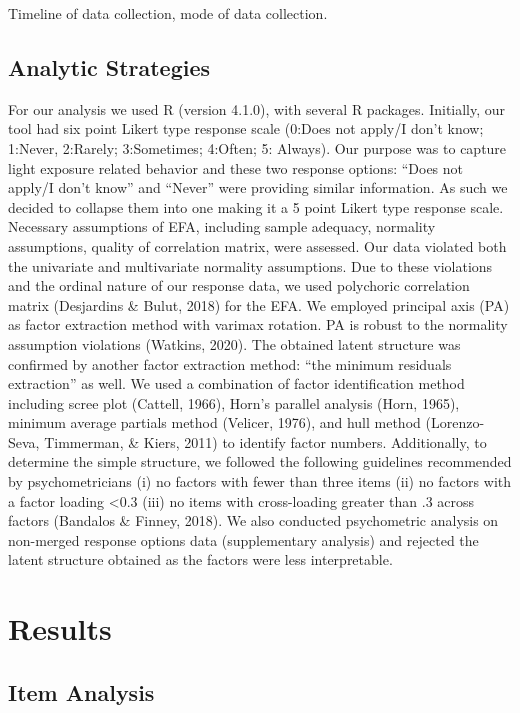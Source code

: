 \documentclass[
  english,
  man]{apa6}
\begin{document}
Timeline of data collection, mode of data collection.

\hypertarget{analytic-strategies}{%
\subsection{Analytic Strategies}\label{analytic-strategies}}

For our analysis we used R (version 4.1.0), with several R packages. Initially, our tool had six point Likert type response scale (0:Does not apply/I don't know; 1:Never, 2:Rarely; 3:Sometimes; 4:Often; 5: Always). Our purpose was to capture light exposure related behavior and these two response options: ``Does not apply/I don't know'' and ``Never'' were providing similar information. As such we decided to collapse them into one making it a 5 point Likert type response scale. Necessary assumptions of EFA, including sample adequacy, normality assumptions, quality of correlation matrix, were assessed. Our data violated both the univariate and multivariate normality assumptions. Due to these violations and the ordinal nature of our response data, we used polychoric correlation matrix (Desjardins \& Bulut, 2018) for the EFA. We employed principal axis (PA) as factor extraction method with varimax rotation. PA is robust to the normality assumption violations (Watkins, 2020). The obtained latent structure was confirmed by another factor extraction method: ``the minimum residuals extraction'' as well. We used a combination of factor identification method including scree plot (Cattell, 1966), Horn's parallel analysis (Horn, 1965), minimum average partials method (Velicer, 1976), and hull method (Lorenzo-Seva, Timmerman, \& Kiers, 2011) to identify factor numbers. Additionally, to determine the simple structure, we followed the following guidelines recommended by psychometricians (i) no factors with fewer than three items (ii) no factors with a factor loading \textless0.3 (iii) no items with cross-loading greater than .3 across factors (Bandalos \& Finney, 2018).
We also conducted psychometric analysis on non-merged response options data (supplementary analysis) and rejected the latent structure obtained as the factors were less interpretable.

\hypertarget{results}{%
\section{Results}\label{results}}

\hypertarget{item-analysis}{%
\subsection{Item Analysis}\label{item-analysis}}
\end{document}
